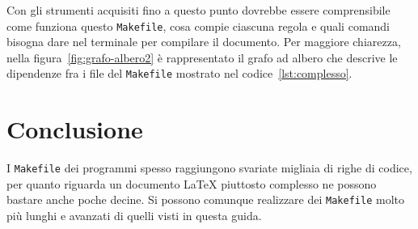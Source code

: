 Con gli strumenti acquisiti fino a questo punto dovrebbe essere comprensibile
come funziona questo \verb|Makefile|, cosa compie ciascuna regola e quali
comandi bisogna dare nel terminale per compilare il documento.  Per maggiore
chiarezza, nella figura~\ref{fig:grafo-albero2} è rappresentato il grafo ad
albero che descrive le dipendenze fra i file del \verb|Makefile| mostrato nel
codice~\ref{lst:complesso}.

\section{Conclusione}
\label{sec:conclusione}

I \verb|Makefile| dei programmi spesso raggiungono svariate migliaia di righe di
codice, per quanto riguarda un documento \LaTeX{}
piuttosto complesso ne possono bastare anche poche decine.  Si possono comunque
realizzare dei \verb|Makefile| molto più lunghi e avanzati di quelli visti in
questa guida.

